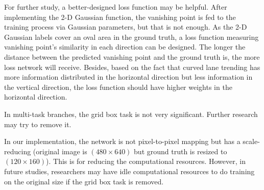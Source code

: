 \begin{spacing}{1.5}
For further study, a better-designed loss function may be helpful. After implementing the 2-D Gaussian function, the vanishing point is fed to the training process via Gaussian parameters, but that is not enough. As the 2-D Gaussian labels cover an oval area in the ground truth, a loss function measuring vanishing point's similarity in each direction can be designed. The longer the distance between the predicted vanishing point and the ground truth is, the more loss network will receive. Besides, based on the fact that curved lane trending has more information distributed in the horizontal direction but less information in the vertical direction, the loss function should have higher weights in the horizontal direction.

In multi-task branches, the grid box task is not very significant. Further research may try to remove it.

In our implementation, the network is not pixel-to-pixel mapping but has a scale-reducing (original image is $(480 \times 640)$ but ground truth is resized to $(120 \times 160)$). This is for reducing the computational resources. However, in future studies, researchers may have idle computational resources to do training on the original size if the grid box task is removed. 




\end{spacing}
\newpage
